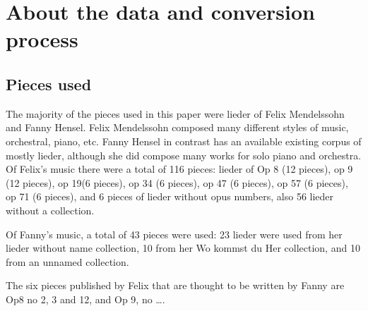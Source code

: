 \documentclass[12pt,twoside]{reedthesis}
\theoremstyle{definition}
\theoremstyle{definition}
\theoremstyle{definition}
\theoremstyle{remark}
\begin{document}
\chapter{About the data and conversion
process}\label{about-the-data-and-conversion-process}

\section{Pieces used}\label{pieces-used}

The majority of the pieces used in this paper were lieder of Felix
Mendelssohn and Fanny Hensel. Felix Mendelssohn composed many different
styles of music, orchestral, piano, etc. Fanny Hensel in contrast has an
available existing corpus of mostly lieder, although she did compose
many works for solo piano and orchestra. Of Felix's music there were a
total of 116 pieces: lieder of Op 8 (12 pieces), op 9 (12 pieces), op
19(6 pieces), op 34 (6 pieces), op 47 (6 pieces), op 57 (6 pieces), op
71 (6 pieces), and 6 pieces of lieder without opus numbers, also 56
lieder without a collection.

Of Fanny's music, a total of 43 pieces were used: 23 lieder were used
from her lieder without name collection, 10 from her Wo kommst du Her
collection, and 10 from an unnamed collection.

The six pieces published by Felix that are thought to be written by
Fanny are Op8 no 2, 3 and 12, and Op 9, no \ldots{}.
\end{document}
